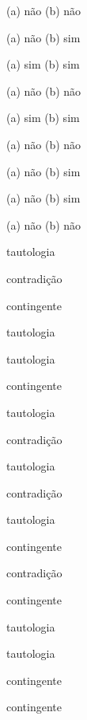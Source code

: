 \begin{earg}
\item %
(a) não (b) não
\item %
(a) não (b) sim
\item %
(a) sim (b) sim
\item %
(a) não (b) não
\item %
(a) sim (b) sim
\item %
(a) não (b) não
\item %
(a) não (b) sim
\item %
(a) não (b) sim
\item %
(a) não (b) não
\end{earg}




\begin{earg}
\item tautologia
\item contradição
\item contingente
\item tautologia
\item tautologia
\item contingente
\item tautologia
\item contradição
\item tautologia
\item contradição
\item tautologia
\item contingente
\item contradição
\item contingente
\item tautologia
\item tautologia
\item contingente
\item contingente
\end{earg}

\noSeq
\nextSeq
\nextSeq
\noSeq
\nextSeq
\nextSeq
\noSeq
\nextSeq
\lastSeq
\noSeq

